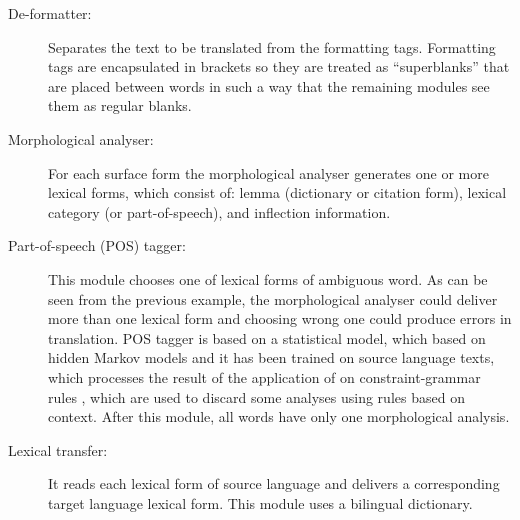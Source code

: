 \documentclass[11pt]{article}
\begin{document}
\begin{description}
\item[De-formatter:] Separates the text to be translated from the formatting tags.  Formatting tags are 
  encapsulated in brackets so they are treated as ``superblanks'' that are placed between words in 
  such a way that the remaining modules see them as regular blanks.  
\item[Morphological analyser:] For each surface form the morphological analyser generates one or more 
  lexical forms, which consist of: lemma (dictionary or citation form), lexical category (or part-of-speech), 
  and inflection information. 
\item[Part-of-speech (POS) tagger:] This module chooses one of lexical forms of ambiguous word. As can be 
  seen from the previous example, the morphological analyser could deliver more than one lexical form and 
  choosing wrong one could produce errors in translation. POS tagger is based on a statistical model, which 
  based on hidden Markov models and it has been trained on source language texts, which processes the 
  result of the application of  on constraint-grammar rules \citep{karlsson95}, which are used to discard some 
  analyses using rules based on context. 
After  this module, all words have only one morphological analysis.
\item[Lexical transfer:] It reads each lexical form of source language and delivers a corresponding target language 
  lexical form. This module uses a bilingual dictionary. 

\end{description}
\end{document}
